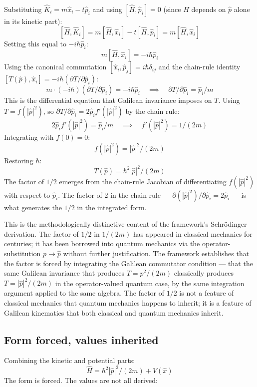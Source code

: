 \documentclass[11pt,a4paper]{article}
\begin{document}
Substituting $\hat{K}_i = m\hat{x}_i - t\hat{p}_i$ and using $[\hat{H}, \hat{p}_i] = 0$ (since $\hat{H}$ depends on $\hat{p}$ alone in its kinetic part):
\[
[\hat{H}, \hat{K}_i] = m[\hat{H}, \hat{x}_i] - t[\hat{H}, \hat{p}_i] = m[\hat{H}, \hat{x}_i]
\]
Setting this equal to $-i\hbar\hat{p}_i$:
\[
m[\hat{H}, \hat{x}_i] = -i\hbar \hat{p}_i
\]
Using the canonical commutation $[\hat{x}_i, \hat{p}_j] = i\hbar\delta_{ij}$ and the chain-rule identity $[T(\hat{p}), \hat{x}_i] = -i\hbar(\partial T/\partial \hat{p}_i)$:
\[
m \cdot (-i\hbar)(\partial T/\partial \hat{p}_i) = -i\hbar \hat{p}_i \quad\implies\quad \partial T/\partial \hat{p}_i = \hat{p}_i / m
\]
This is the differential equation that Galilean invariance imposes on $T$. Using $T = f(|\hat{p}|^{2})$, so $\partial T/\partial \hat{p}_i = 2\hat{p}_i f'(|\hat{p}|^{2})$ by the chain rule:
\[
2 \hat{p}_i f'(|\hat{p}|^{2}) = \hat{p}_i / m \quad\implies\quad f'(|\hat{p}|^{2}) = 1/(2m)
\]
Integrating with $f(0) = 0$:
\[
f(|\hat{p}|^{2}) = |\hat{p}|^{2} / (2m)
\]
Restoring $\hbar$:
\[
T(\hat{p}) = \hbar^{2} |\hat{p}|^{2} / (2m)
\]
The factor of $1/2$ emerges from the chain-rule Jacobian of differentiating $f(|\hat{p}|^{2})$ with respect to $\hat{p}_i$. The factor of $2$ in the chain rule --- $\partial(|\hat{p}|^{2})/\partial\hat{p}_i = 2\hat{p}_i$ --- is what generates the $1/2$ in the integrated form.

This is the methodologically distinctive content of the framework's Schr\"odinger derivation. The factor of $1/2$ in $1/(2m)$ has appeared in classical mechanics for centuries; it has been borrowed into quantum mechanics via the operator-substitution $p \to \hat{p}$ without further justification. The framework establishes that the factor is forced by integrating the Galilean commutator condition --- that the same Galilean invariance that produces $T = p^{2}/(2m)$ classically produces $T = |\hat{p}|^{2}/(2m)$ in the operator-valued quantum case, by the same integration argument applied to the same algebra. The factor of $1/2$ is not a feature of classical mechanics that quantum mechanics happens to inherit; it is a feature of Galilean kinematics that both classical and quantum mechanics inherit.

\subsection{Form forced, values inherited}

Combining the kinetic and potential parts:
\[
\hat{H} = \hbar^{2} |\hat{p}|^{2} / (2m) + V(\hat{x})
\]
The form is forced. The values are not all derived:
\end{document}
